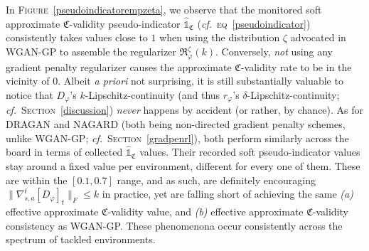 In \textsc{Figure}~\ref{pseudoindicatorempzeta},
we observe that the monitored
soft approximate $\mathfrak{C}$-validity pseudo-indicator $\widehat{\mathds{1}}_\mathfrak{C}$
(\textit{cf.}~\textsc{eq}~\ref{pseudoindicator})
consistently takes values close to $1$ when using the distribution $\zeta$ advocated in WGAN-GP
to assemble the regularizer $\mathfrak{R}_\varphi^\zeta (k)$.
Conversely, \emph{not} using any gradient penalty regularizer causes the approximate $\mathfrak{C}$-validity
rate to be in the vicinity of $0$.
Albeit \textit{a priori} not surprising, it is still substantially valuable to notice that $D_\varphi$'s
$k$-Lipschitz-continuity
(and thus $r_\varphi$'s $\delta$-Lipschitz-continuity; \textit{cf.}~\textsc{Section}~\ref{discussion})
\emph{never} happens by accident (or rather, by chance).
As for DRAGAN and NAGARD (both being non-directed gradient penalty schemes, unlike WGAN-GP;
\textit{cf.}~\textsc{Section}~\ref{gradpenrl}),
both perform similarly across the board
in terms of collected $\widehat{\mathds{1}}_\mathfrak{C}$ values.
Their recorded soft pseudo-indicator values stay around a fixed value per environment, different
for every one of them. These are within the $[0.1, 0.7]$ range, and as such,
are definitely encouraging $\lVert \nabla_{s,a}^t[D_\varphi]_t \rVert _F \leq k$ in practice,
yet are falling short of achieving the same
\textit{(a)} effective approximate $\mathfrak{C}$-validity value,
and \textit{(b)} effective approximate $\mathfrak{C}$-validity consistency
as WGAN-GP.
These phenomenona occur consistently across the spectrum of tackled environments.

